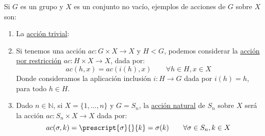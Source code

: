 \begin{ejemplo}
    Si $G$ es un grupo y $X$ es un conjunto no vacío, ejemplos de acciones de $G$ sobre $X$ son:
    \begin{enumerate}
        \item La \underline{acción trivial}:
        \item Si tenemos una acción $ac:G\times X\to X$ y $H<G$, podemos considerar la \underline{acción por restricción} $ac:H\times X\to X$, dada por:
            \begin{equation*}
                ac(h,x) = ac(i(h),x) \qquad \forall h\in H, x\in X
            \end{equation*}
            Donde consideramos la aplicación inclusión $i:H\to G$ dada por $i(h) = h$, para todo $h\in H$.
        \item Dado $n\in \mathbb{N}$, si $X = \{1,\ldots,n\}$ y $G = S_n$, la \underline{acción natural} de $S_n$ sobre $X$ será la acción $ac:S_n\times X\to X$ dada por:
            \begin{equation*}
                ac(\sigma,k) = \prescript{\sigma}{}{k} = \sigma(k) \qquad \forall \sigma\in S_n, k\in X
            \end{equation*}
    \end{enumerate}
\end{ejemplo}


